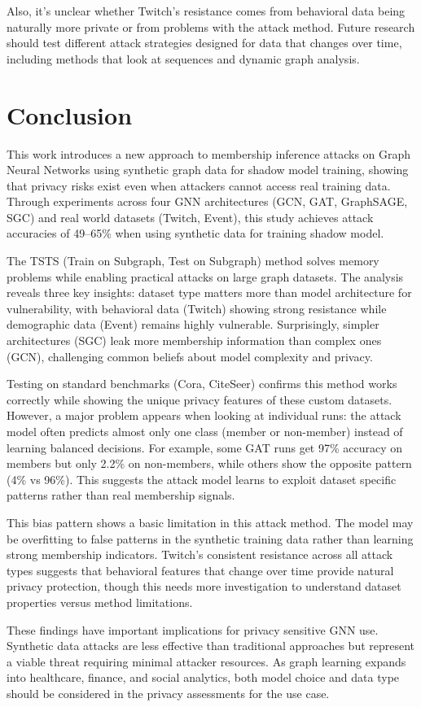 \documentclass{article}
\begin{document}
Also, it's unclear whether Twitch's resistance comes from behavioral data being naturally more private or from problems with the attack method. Future research should test different attack strategies designed for data that changes over time, including methods that look at sequences and dynamic graph analysis.

\section{Conclusion}
This work introduces a new approach to membership inference attacks on Graph Neural Networks using synthetic graph data for shadow model training, showing that privacy risks exist even when attackers cannot access real training data. Through experiments across four GNN architectures (GCN, GAT, GraphSAGE, SGC) and real world datasets (Twitch, Event), this study achieves attack accuracies of 49--65\% when using synthetic data for training shadow model.

The TSTS (Train on Subgraph, Test on Subgraph) method solves memory problems while enabling practical attacks on large graph datasets. The analysis reveals three key insights: dataset type matters more than model architecture for vulnerability, with behavioral data (Twitch) showing strong resistance while demographic data (Event) remains highly vulnerable. Surprisingly, simpler architectures (SGC) leak more membership information than complex ones (GCN), challenging common beliefs about model complexity and privacy.

Testing on standard benchmarks (Cora, CiteSeer) confirms this method works correctly while showing the unique privacy features of these custom datasets. However, a major problem appears when looking at individual runs: the attack model often predicts almost only one class (member or non-member) instead of learning balanced decisions. For example, some GAT runs get 97\% accuracy on members but only 2.2\% on non-members, while others show the opposite pattern (4\% vs 96\%). This suggests the attack model learns to exploit dataset specific patterns rather than real membership signals.

This bias pattern shows a basic limitation in this attack method. The model may be overfitting to false patterns in the synthetic training data rather than learning strong membership indicators. Twitch's consistent resistance across all attack types suggests that behavioral features that change over time provide natural privacy protection, though this needs more investigation to understand dataset properties versus method limitations.

These findings have important implications for privacy sensitive GNN use. Synthetic data attacks are less effective than traditional approaches but represent a viable threat requiring minimal attacker resources. As graph learning expands into healthcare, finance, and social analytics, both model choice and data type should be considered  in the privacy assessments for the use case.




\end{document}
